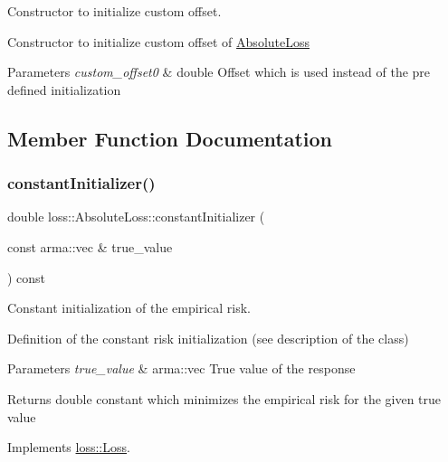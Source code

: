 Constructor to initialize custom offset. 

Constructor to initialize custom offset of {\ttfamily \mbox{\hyperlink{classloss_1_1_absolute_loss}{Absolute\+Loss}}}


\begin{DoxyParams}{Parameters}
{\em custom\+\_\+offset0} & {\ttfamily double} Offset which is used instead of the pre defined initialization \\
\hline
\end{DoxyParams}


\subsection{Member Function Documentation}
\mbox{\label{classloss_1_1_absolute_loss_aa2ac5fb1fdf3ce0f48decd77d375ef76}} 
\subsubsection{\texorpdfstring{constant\+Initializer()}{constantInitializer()}}
{\footnotesize\ttfamily double loss\+::\+Absolute\+Loss\+::constant\+Initializer (\begin{DoxyParamCaption}\item[{const arma\+::vec \&}]{true\+\_\+value }\end{DoxyParamCaption}) const\hspace{0.3cm}{\ttfamily [virtual]}}



Constant initialization of the empirical risk. 

Definition of the constant risk initialization (see description of the class)


\begin{DoxyParams}{Parameters}
{\em true\+\_\+value} & {\ttfamily arma\+::vec} True value of the response\\
\hline
\end{DoxyParams}
\begin{DoxyReturn}{Returns}
{\ttfamily double} constant which minimizes the empirical risk for the given true value 
\end{DoxyReturn}


Implements \mbox{\hyperlink{classloss_1_1_loss_a65fe7dcd9370e6a549b8d1cc95fc8798}{loss\+::\+Loss}}.


